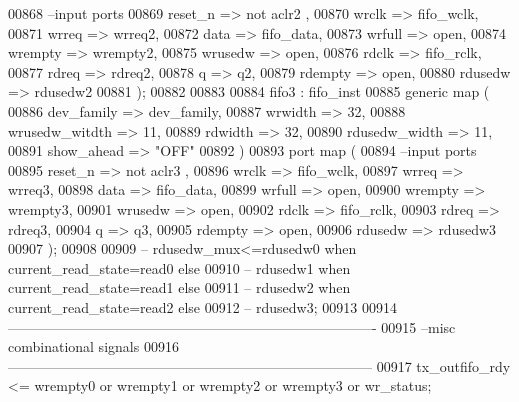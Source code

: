 \begin{DoxyCode}
00868 \textcolor{keyword}{      --input ports }
00869       reset_n       => \textcolor{keywordflow}{not} aclr2 , 
00870       wrclk         => fifo_wclk,
00871       wrreq         => wrreq2,
00872       data          => fifo_data, 
00873       wrfull        => \textcolor{keywordflow}{open},
00874         wrempty       => wrempty2, 
00875       wrusedw       => \textcolor{keywordflow}{open},
00876       rdclk          => fifo_rclk,
00877       rdreq         => rdreq2,
00878       q             => q2,
00879       rdempty       => \textcolor{keywordflow}{open},
00880       rdusedw       => rdusedw2     
00881         \textcolor{vhdlchar}{)};
00882 
00883 
00884     fifo3 :  fifo_inst 
00885   \textcolor{keywordflow}{generic} \textcolor{keywordflow}{map} (
00886             dev_family      => dev_family, 
00887             wrwidth         => \textcolor{vhdllogic}{32}, 
00888             wrusedw_witdth  => \textcolor{vhdllogic}{11}, 
00889             rdwidth         => \textcolor{vhdllogic}{32}, 
00890             rdusedw_width   => \textcolor{vhdllogic}{11},
00891             show_ahead      => \textcolor{keyword}{"OFF"}
00892   \textcolor{vhdlchar}{)}  
00893   \textcolor{keywordflow}{port} \textcolor{keywordflow}{map} (
00894 \textcolor{keyword}{      --input ports }
00895       reset_n       => \textcolor{keywordflow}{not} aclr3 , 
00896       wrclk         => fifo_wclk,
00897       wrreq         => wrreq3,
00898       data          => fifo_data, 
00899       wrfull        => \textcolor{keywordflow}{open},
00900         wrempty       => wrempty3, 
00901       wrusedw       => \textcolor{keywordflow}{open},
00902       rdclk          => fifo_rclk,
00903       rdreq         => rdreq3,
00904       q             => q3,
00905       rdempty       => \textcolor{keywordflow}{open},
00906       rdusedw       => rdusedw3     
00907         \textcolor{vhdlchar}{)};
00908   
00909 \textcolor{keyword}{--   rdusedw\_mux<=rdusedw0 when current\_read\_state=read0 else }
00910 \textcolor{keyword}{--                rdusedw1 when current\_read\_state=read1 else }
00911 \textcolor{keyword}{--                rdusedw2 when current\_read\_state=read2 else }
00912 \textcolor{keyword}{--                rdusedw3;}
00913 
00914 \textcolor{keyword}{-------------------------------------------------------------------------------}
00915 \textcolor{keyword}{--misc combinational signals}
00916 \textcolor{keyword}{------------------------------------------------------------------------------   }
00917 \textcolor{vhdlchar}{tx_outfifo_rdy}  \textcolor{vhdlchar}{<=}  \textcolor{vhdlchar}{wrempty0} \textcolor{keywordflow}{or} \textcolor{vhdlchar}{wrempty1} \textcolor{keywordflow}{or} \textcolor{vhdlchar}{wrempty2} \textcolor{keywordflow}{or} \textcolor{vhdlchar}{wrempty3} \textcolor{keywordflow}{or} \textcolor{vhdlchar}{wr_status};

\end{DoxyCode}
